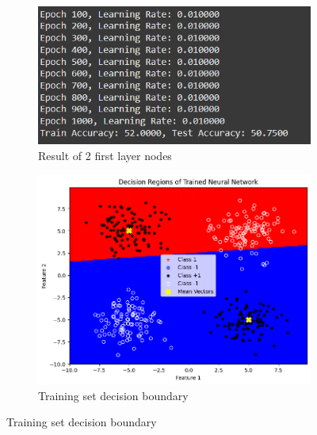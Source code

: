 \documentclass[a4paper,12pt]{article}
\begin{document}
\begin{figure}[H]
    \centering
    \captionsetup[subfigure]{list=true} %

    \begin{subfigure}{0.5\textwidth}
        \centering
        \includegraphics[width=\textwidth]{2.2_2_r.png}
        \caption{Result of 2 first layer nodes}
    \end{subfigure}
    \begin{subfigure}{0.45\textwidth}
        \centering
        \includegraphics[width=\textwidth]{2.2_2_Train.png}
        \caption{Training set decision boundary}
    \end{subfigure}


\end{figure}
\end{document}
